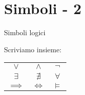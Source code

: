 \section{Simboli - 2}
  \begin{frame}{Simboli logici}

    Scriviamo insieme:
    
\begin{table}[h!]
\begin{tabular}{c c c}
\hline
$\lor$ & $\land$ & $\neg$ \\
$\exists$ & $\nexists$ & $\forall$ \\
$\implies$ & $\iff$ & $\models$ \\
\hline
\end{tabular}
\end{table}

\end{frame}
